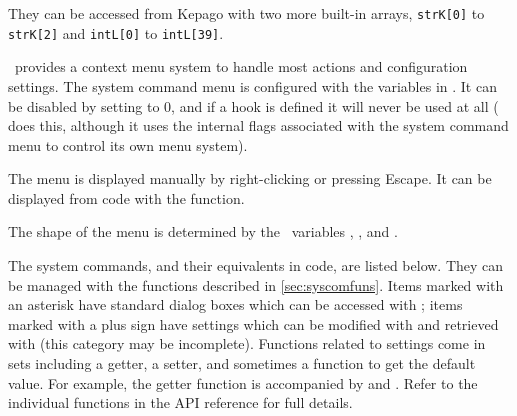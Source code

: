     They can be accessed from Kepago with two more built-in arrays, 
    \lstinline|strK[0]| to \lstinline|strK[2]| and \lstinline|intL[0]| to
    \lstinline|intL[39]|.

\label{sec:syscom}

  \reallive\ provides a context menu system to handle most actions and 
  configuration settings.  The system command menu is configured with the 
   variables in \gameexe.  It can be disabled by setting 
   to 0, and if a  hook is 
  defined it will never be used at all ( does this, although it 
  uses the internal flags associated with the system command menu to control its 
  own menu system).

  The menu is displayed manually by right-clicking or pressing Escape.  It can
  be displayed from code with the  function.

  The shape of the menu is determined by the \gameexe\ variables 
  , ,
  and .
  
  The system commands, and their equivalents in code, are listed below.  They 
  can be managed with the functions described in \ref{sec:syscomfuns}. Items 
  marked with an asterisk have standard dialog boxes which can be accessed with 
  ; items marked with a plus sign have settings which can be 
  modified with  and retrieved with  (this 
  category may be incomplete).  Functions related to settings come in sets 
  including a getter, a setter, and sometimes a function to get the default 
  value.  For example, the getter function  is accompanied by 
   and .  Refer to the individual 
  functions in the API reference for full details.

